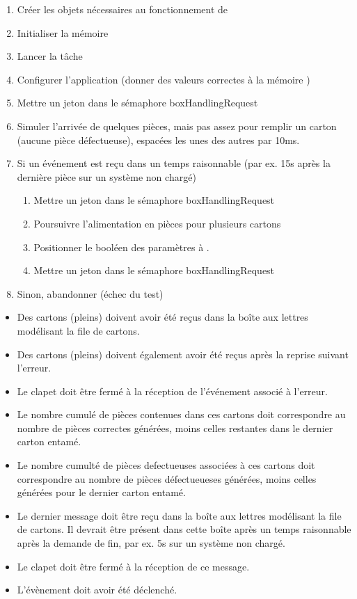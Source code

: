 {
\begin{enumerate}
	\item Créer les objets nécessaires au fonctionnement de 
	\item Initialiser la mémoire 
	\item Lancer la tâche 
	\item Configurer l'application (donner des valeurs correctes à la mémoire )
	\item Mettre un jeton dans le sémaphore boxHandlingRequest
	\item Simuler l'arrivée de quelques pièces, mais pas assez pour remplir un carton (aucune pièce défectueuse), espacées les unes des autres par 10ms.
	\item Si un événement  est reçu dans un temps raisonnable (par ex. 15s après la dernière pièce sur un système non chargé)
		\begin{enumerate}
			\item Mettre un jeton dans le sémaphore boxHandlingRequest
			\item Poursuivre l'alimentation en pièces pour plusieurs cartons
			\item Positionner le booléen  des paramètres à .
			\item Mettre un jeton dans le sémaphore boxHandlingRequest
		\end{enumerate}
	\item Sinon, abandonner (échec du test)
\end{enumerate}
}
{
\begin{itemize}
	\item Des cartons (pleins) doivent avoir été reçus dans la boîte aux lettres modélisant la file de cartons.
	\item Des cartons (pleins) doivent également avoir été reçus après la reprise suivant l'erreur.
	\item Le clapet doit être fermé à la réception de l'événement associé à l'erreur.
	\item Le nombre cumulé de pièces contenues dans ces cartons doit correspondre au nombre de pièces correctes générées, moins celles restantes dans le dernier carton entamé.
	\item Le nombre cumulté de pièces defectueuses associées à ces cartons doit correspondre au nombre de pièces défectueueses générées, moins celles générées pour le dernier carton entamé.
	\item Le dernier message doit être reçu dans la boîte aux lettres modélisant la file de cartons. Il devrait être présent dans cette boîte après un temps raisonnable après la demande de fin, par ex. 5s sur un système non chargé.
	\item Le clapet doit être fermé à la réception de ce message.
	\item L'évènement  doit avoir été déclenché.
\end{itemize}
}

